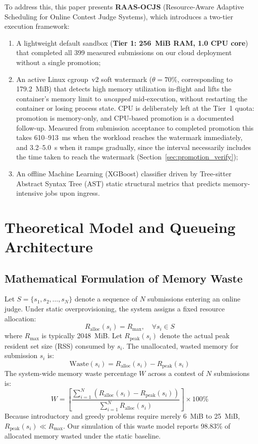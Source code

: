 \documentclass[conference]{IEEEtran}
\begin{document}
To address this, this paper presents \textbf{RAAS-OCJS} (Resource-Aware Adaptive Scheduling for Online Contest Judge Systems), which introduces a two-tier execution framework:
\begin{enumerate}
    \item A lightweight default sandbox (\textbf{Tier 1: 256~MiB RAM, 1.0 CPU core}) that completed all 399 measured submissions on our cloud deployment without a single promotion;
    \item An active Linux cgroup~v2 soft watermark ($\theta = 70\%$, corresponding to 179.2~MiB) that detects high memory utilization in-flight and lifts the container's memory limit to \emph{uncapped} mid-execution, without restarting the container or losing process state. CPU is deliberately left at the Tier~1 quota: promotion is memory-only, and CPU-based promotion is a documented follow-up. Measured from submission acceptance to completed promotion this takes 610--913~ms when the workload reaches the watermark immediately, and 3.2--5.0~s when it ramps gradually, since the interval necessarily includes the time taken to reach the watermark (Section~\ref{sec:promotion_verify});
    \item An offline Machine Learning (XGBoost) classifier driven by Tree-sitter Abstract Syntax Tree (AST) static structural metrics that predicts memory-intensive jobs upon ingress.
\end{enumerate}



\section{Theoretical Model and Queueing Architecture}

\subsection{Mathematical Formulation of Memory Waste}
Let $S = \{s_1, s_2, \dots, s_N\}$ denote a sequence of $N$ submissions entering an online judge. Under static overprovisioning, the system assigns a fixed resource allocation:
\begin{equation}
R_{\mathrm{alloc}}(s_i) = R_{\mathrm{max}}, \quad \forall s_i \in S
\end{equation}
where $R_{\mathrm{max}}$ is typically 2048~MiB. Let $R_{\mathrm{peak}}(s_i)$ denote the actual peak resident set size (RSS) consumed by $s_i$. The unallocated, wasted memory for submission $s_i$ is:
\begin{equation}
\mathrm{Waste}(s_i) = R_{\mathrm{alloc}}(s_i) - R_{\mathrm{peak}}(s_i)
\end{equation}
The system-wide memory waste percentage $W$ across a contest of $N$ submissions is:
\begin{equation}
W = \left[ \frac{\sum_{i=1}^N \left( R_{\mathrm{alloc}}(s_i) - R_{\mathrm{peak}}(s_i) \right)}{\sum_{i=1}^N R_{\mathrm{alloc}}(s_i)} \right] \times 100\%
\end{equation}
Because introductory and greedy problems require merely 6~MiB to 25~MiB, $R_{\mathrm{peak}}(s_i) \ll R_{\mathrm{max}}$. Our simulation of this waste model reports 98.83\% of allocated memory wasted under the static baseline.
\end{document}
